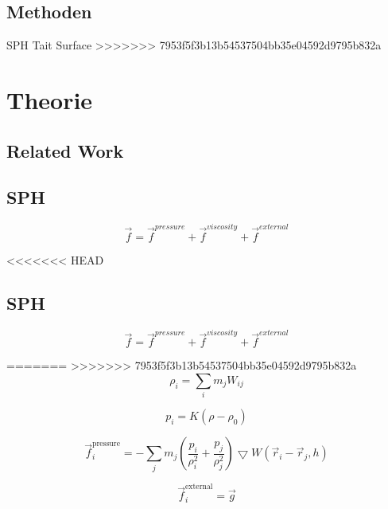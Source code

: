 \documentclass[a4paper]{paper}
\begin{document}
\subsection{Methoden}
SPH
Tait
Surface
>>>>>>> 7953f5f3b13b54537504bb35e04592d9795b832a

\section{Theorie}
\subsection{Related Work}%
\subsection{SPH}

\begin{equation}
\label{force}
\vec{f} = \vec{f}^{pressure} + \vec{f}^{viscosity} + \vec{f}^{external}
\end{equation}


<<<<<<< HEAD
\subsection{SPH}

\begin{equation}
\label{force}
\vec{f} = \vec{f}^{pressure} + \vec{f}^{viscosity} + \vec{f}^{external}
\end{equation}


=======
>>>>>>> 7953f5f3b13b54537504bb35e04592d9795b832a
\begin{equation}
\label{density}
\rho_i = \sum_i{m_j W_{ij}}
\end{equation}



\begin{equation}
\label{pressure}
p_i=K(\rho-\rho_0)
\end{equation}

\begin{equation}
\label{force_pressure}
\vec{f}^{\text{pressure}}_{i} = - \sum_{j}m_{j}(\frac{p_{i}}{\rho_{i}^2} +\frac{p_{j}}{\rho_{j}^2})\bigtriangledown W(\vec{r}_{i}-\vec{r}_{j},h)
\end{equation}

\begin{equation}
\label{force_external}
\vec{f}^{\text{external}}_{i} = \vec{g}
\end{equation}
\end{document}
